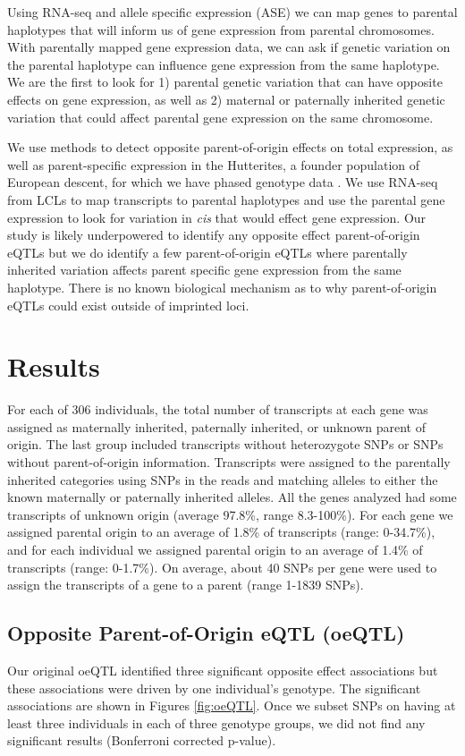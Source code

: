 Using RNA-seq and allele specific expression (ASE) we can map genes to parental haplotypes that will inform us of gene expression from parental chromosomes. With parentally mapped gene expression data, we can ask if genetic variation on the parental haplotype can influence gene expression from the same haplotype.  We are the first to look for 1) parental genetic variation that can have opposite effects on gene expression, as well as 2) maternal or paternally inherited genetic variation that could affect parental gene expression on the same chromosome. 	

We use methods to detect opposite parent-of-origin effects on total expression, as well as parent-specific expression in the Hutterites, a founder population of European descent, for which we have phased genotype data \cite{Livne2015}. We use RNA-seq from LCLs to map transcripts to parental haplotypes and use the parental gene expression to look for variation in \emph{cis} that would effect gene expression. Our study is likely underpowered to identify any opposite effect parent-of-origin eQTLs but we do identify a few parent-of-origin eQTLs where parentally inherited variation affects parent specific gene expression from the same haplotype. There is no known biological mechanism as to why parent-of-origin eQTLs could exist outside of imprinted loci.

\section{Results}\label{ch04-results}

For each of 306 individuals, the total number of transcripts at each gene was assigned as maternally inherited, paternally inherited, or unknown parent of origin. The last group included transcripts without heterozygote SNPs or SNPs without parent-of-origin information. Transcripts were assigned to the parentally inherited categories using SNPs in the reads and matching alleles to either the known maternally or paternally inherited alleles. All the genes analyzed had some transcripts of unknown origin (average 97.8\%, range 8.3-100\%). For each gene we assigned parental origin to an average of 1.8\% of transcripts (range: 0-34.7\%), and for each individual we assigned parental origin to an average of 1.4\% of transcripts (range: 0-1.7\%). On average, about 40 SNPs per gene were used to assign the transcripts of a gene to a parent (range 1-1839 SNPs). 


\subsection{Opposite Parent-of-Origin eQTL (oeQTL) }\label{Opposite Parent-of-Origin eQTL (oeQTL)} 
Our original oeQTL identified three significant opposite effect associations but these associations were driven by one individual's genotype. The significant associations are shown in Figures \ref{fig:oeQTL}. Once we subset SNPs on having at least three individuals in each of three genotype groups, we did not find any significant results (Bonferroni corrected p-value). 


